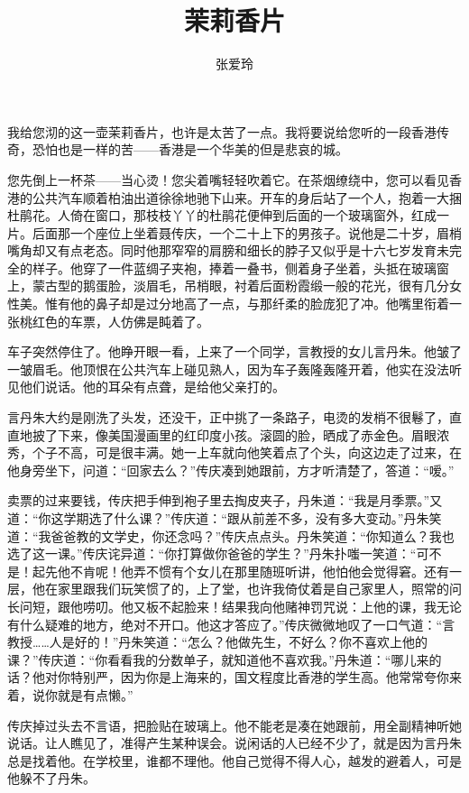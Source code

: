 \documentclass[UTF8]{ctexart}
\title{茉莉香片}
\author{张爱玲}
\date{}
\begin{document}
\maketitle

\newpage

我给您沏的这一壶茉莉香片，也许是太苦了一点。我将要说给您听的一段香港传奇，恐怕也是一样的苦——香港是一个华美的但是悲哀的城。

您先倒上一杯茶——当心烫！您尖着嘴轻轻吹着它。在茶烟缭绕中，您可以看见香港的公共汽车顺着柏油出道徐徐地驰下山来。开车的身后站了一个人，抱着一大捆杜鹃花。人倚在窗口，那枝枝丫丫的杜鹃花便伸到后面的一个玻璃窗外，红成一片。后面那一个座位上坐着聂传庆，一个二十上下的男孩子。说他是二十岁，眉梢嘴角却又有点老态。同时他那窄窄的肩膀和细长的脖子又似乎是十六七岁发育未完全的样子。他穿了一件蓝绸子夹袍，捧着一叠书，侧着身子坐着，头抵在玻璃窗上，蒙古型的鹅蛋脸，淡眉毛，吊梢眼，衬着后面粉霞缎一般的花光，很有几分女性美。惟有他的鼻子却是过分地高了一点，与那纤柔的脸庞犯了冲。他嘴里衔着一张桃红色的车票，人仿佛是盹着了。 

车子突然停住了。他睁开眼一看，上来了一个同学，言教授的女儿言丹朱。他皱了一皱眉毛。他顶恨在公共汽车上碰见熟人，因为车子轰隆轰隆开着，他实在没法听见他们说话。他的耳朵有点聋，是给他父亲打的。 

言丹朱大约是刚洗了头发，还没干，正中挑了一条路子，电烫的发梢不很鬈了，直直地披了下来，像美国漫画里的红印度小孩。滚圆的脸，晒成了赤金色。眉眼浓秀，个子不高，可是很丰满。她一上车就向他笑着点了个头，向这边走了过来，在他身旁坐下，问道：“回家去么？”传庆凑到她跟前，方才听清楚了，答道：“嗳。” 

卖票的过来要钱，传庆把手伸到袍子里去掏皮夹子，丹朱道：“我是月季票。”又道：“你这学期选了什么课？”传庆道：“跟从前差不多，没有多大变动。”丹朱笑道：“我爸爸教的文学史，你还念吗？”传庆点点头。丹朱笑道：“你知道么？我也选了这一课。”传庆诧异道：“你打算做你爸爸的学生？”丹朱扑嗤一笑道：“可不是！起先他不肯呢！他弄不惯有个女儿在那里随班听讲，他怕他会觉得窘。还有一层，他在家里跟我们玩笑惯了的，上了堂，也许我倚仗着是自己家里人，照常的问长问短，跟他唠叨。他又板不起脸来！结果我向他赌神罚咒说：上他的课，我无论有什么疑难的地方，绝对不开口。他这才答应了。”传庆微微地叹了一口气道：“言教授……人是好的！”丹朱笑道：“怎么？他做先生，不好么？你不喜欢上他的课？”传庆道：“你看看我的分数单子，就知道他不喜欢我。”丹朱道：“哪儿来的话？他对你特别严，因为你是上海来的，国文程度比香港的学生高。他常常夸你来着，说你就是有点懒。”

传庆掉过头去不言语，把脸贴在玻璃上。他不能老是凑在她跟前，用全副精神听她说话。让人瞧见了，准得产生某种误会。说闲话的人已经不少了，就是因为言丹朱总是找着他。在学校里，谁都不理他。他自己觉得不得人心，越发的避着人，可是他躲不了丹朱。
\end{document}
